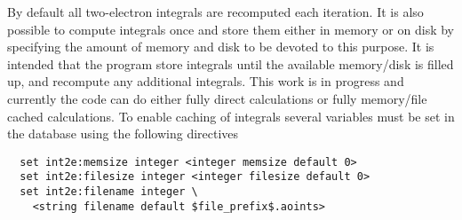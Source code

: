 By default all two-electron integrals are recomputed each iteration.
It is also possible to compute integrals once and store them either in
memory or on disk by specifying the amount of memory and disk to be
devoted to this purpose.  It is intended that the program store
integrals until the available memory/disk is filled up, and
recompute any additional integrals.  This work is in progress and
currently the code can do either fully direct calculations or
fully memory/file cached calculations.  To enable caching of integrals
several variables must be set in the database using the following
directives
\begin{verbatim}
  set int2e:memsize integer <integer memsize default 0>
  set int2e:filesize integer <integer filesize default 0>
  set int2e:filename integer \
    <string filename default $file_prefix$.aoints>
\end{verbatim}

